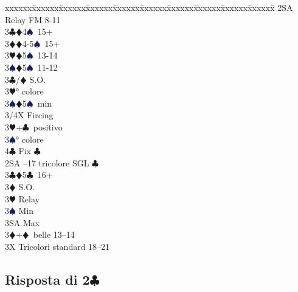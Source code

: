 \documentclass[a4paper,italian]{article}
\newcommand{\BC}{\textcolor{OliveGreen}{$\clubsuit$}}
\newcommand{\BD}{\textcolor{RedOrange}{$\vardiamondsuit$}}
\newcommand{\BH}{\textcolor{Red2}{$\varheartsuit${}}}
\newcommand{\BS}{\textcolor{MidnightBlue}{$\spadesuit${}}}
\newcommand{\pdfc}{\texorpdfstring{\BC{}}{C}}
\newenvironment{bidtable}
{\begin{tabbing}

    xxxxxx\=xxxxxx\=xxxxxx\=xxxxxx\=xxxxxx\=xxxxxx\=xxxxxx\=xxxxxx\=xxxxxx\=xxxxxx\=\kill}
{\end{tabbing} }%
\begin{document}
\begin{multicols}{2}
\begin{bidtable}
                                            2SA \> Relay FM 8-11\+\\
                                            3\BC {}\BD 4\BS\ 15+\\
                                            3\BD {}\BD 4-5\BS\ 15+\\
                                            3\BH {}\BD 5\BS\ 13-14\\
                                            3\BS {}\BD 5\BS\ 11-12\-\\
                                            3\BC/\BD \> S.O.\+\\
                                            3\BH {}° colore\\
                                            3\BS {}\BD 5\BS\ min\\
                                            3/4X \> Fircing\-\\
                                            3\BH {}+\BC\ positivo\+\\
                                            3\BS {}° colore\\
                                            4\BC \> Fix \BC \-\-\\
                                            2SA --17 tricolore SGL \BC \\
                                            3\BC {}\BD 5\BC\ 16+\+\\
                                            3\BD \> S.O.\\
                                            3\BH \> Relay\+\\
                                            3\BS \> Min\\
                                            3SA \> Max\-\-\\
                                            3\BD {}+\BD\ belle 13--14\\
                                            3X \> Tricolori standard 18--21
                                        \end{bidtable}

                                    \end{multicols}
                                    \newpage
                                    \subsection{Risposta di 2\pdfc}
\end{document}
